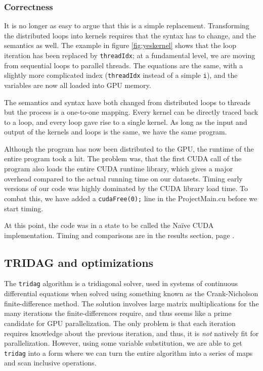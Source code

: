 \documentclass[12pt, oneside]{article}
\begin{document}
\subsubsection{Correctness}
It is no longer as easy to argue that this is a simple replacement. Transforming the distributed loops into kernels requires that the syntax has to change, and the semantics as well. The example in figure \ref{fig:yeskernel} shows that the loop iteration has been replaced by \texttt{threadIdx}; at a fundamental level, we are moving from sequential loops to parallel threads. The equations are the same, with a slightly more complicated index (\texttt{threadIdx} instead of a simple \texttt{i}), and the variables are now all loaded into GPU memory.
						
The semantics and syntax have both changed from distributed loops to threads but the process is a one-to-one mapping. Every kernel can be directly traced back to a loop, and every loop gave rise to a single kernel. As long as the input and output of the kernels and loops is the same, we have the same program.
						
Although the program has now been distributed to the GPU, the runtime of the entire program took a hit. The problem was, that the first CUDA call of the program also loads the entire CUDA runtime library, which gives a major overhead compared to the actual running time on our datasets. Timing early versions of our code was highly dominated by the CUDA library load time. To combat this, we have added a \texttt{cudaFree(0);} line in the ProjectMain.cu before we start timing.

At this point, the code was in a state to be called the Na\"ive CUDA implementation. Timing and comparisons are in the results section, page \pageref{fig:results}.
\subsection{TRIDAG and optimizations}
The \texttt{tridag} algorithm is a tridiagonal solver, used in systems of continuous differential equations when solved using something known as the Crank-Nicholson finite-difference method. The solution involves large matrix multiplications for the many iterations the finite-differences require, and thus seems like a prime candidate for GPU parallelization. The only problem is that each iteration requires knowledge about the previous iteration, and thus, it is \emph{not} natively fit for parallelization. However, using some variable substitution, we are able to get \texttt{tridag} into a form where we can turn the entire algorithm into a series of maps and scan inclusive operations.
\end{document}
